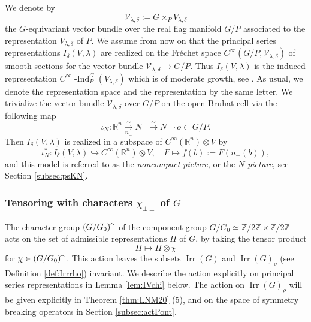 We denote by
\begin{equation}
\label{eqn:Vlmdbdle}
  {\mathcal{V}}_{\lambda,\delta}
  :=
  G \times_P V_{\lambda,\delta}
\end{equation}
 the $G$-equivariant vector bundle over the real flag manifold $G/P$
 associated to the representation 
 $V_{\lambda,\delta}$ of $P$.  
We assume from now on that the principal series representations
 $I_\delta({V},\lambda)$
 are realized  on the Fr{\'e}chet space
 $C^{\infty}(G/P, {\mathcal{V}}_{\lambda,\delta})$
 of smooth sections
 for the vector bundle 
 ${\mathcal{V}}_{\lambda,\delta} \to G/P$.  
Thus 
$I_{\delta}(V,\lambda)$
 is the induced representation 
 $C^{\infty}{\operatorname{-Ind}}_P^G(V_{\lambda, \delta})$
 which is of moderate growth, 
see \cite[Chap.~3, Sect.~4]{sbon}.  
As usual, 
 we denote the representation space and the representation by the same letter. 
We trivialize the vector bundle ${\mathcal{V}}_{\lambda,\delta}$
 over $G/P$
 on the open Bruhat cell via the following map
\[
   \iota_N \colon {\mathbb{R}}^n {\underset {n_-}{\overset \sim \to}} N_-
   \overset \sim \to N_- \cdot o \subset G/P.  
\]
Then $I_{\delta}(V,\lambda)$ is realized in a subspace
 of $C^{\infty}({\mathbb{R}}^n) \otimes V$ by 
\begin{equation}
\label{eqn:iotaN}
   \iota_N^{\ast} \colon 
   I_{\delta}(V,\lambda)
   \hookrightarrow
   C^{\infty}({\mathbb{R}}^n) \otimes V,
   \quad
   F \mapsto f(b):=F(n_-(b)), 
\end{equation}
and this model is referred to as
 the {\it{noncompact picture}}, 
 or the 
{\it{$N$-picture}}, 
 see Section \ref{subsec:psKN}.  


\subsubsection{Tensoring with characters
 $\chi_{\pm\pm}$ of $G$}
The character group $(G/G_0)\hspace{-1mm}{\widehat{\hphantom{m}}}$
 of the component group
 $G/G_0 \simeq {\mathbb{Z}}/2{\mathbb{Z}} \times {\mathbb{Z}}/2{\mathbb{Z}}$
 acts on the set of admissible representations $\Pi$ of $G$, 
 by taking the tensor product
\begin{equation}
\label{eqn:Pichi}
   \Pi \mapsto \Pi \otimes \chi
\end{equation}
for $\chi \in (G/G_0)\hspace{-1mm}{\widehat{\hphantom{m}}}$.  
This action leaves the subsets 
 ${\operatorname{Irr}}(G)$ and ${\operatorname{Irr}}(G)_{\rho}$ 
(see Definition \ref{def:Irrrho})
invariant.  
We describe the action explicitly
 on principal series representations
 in Lemma \ref{lem:IVchi} below.  
The action on 
${\operatorname{Irr}}(G)_{\rho}$
  will be given explicitly 
 in Theorem \ref{thm:LNM20} (5), 
 and on the space of symmetry breaking operators
 in Section \ref{subsec:actPont}.  

